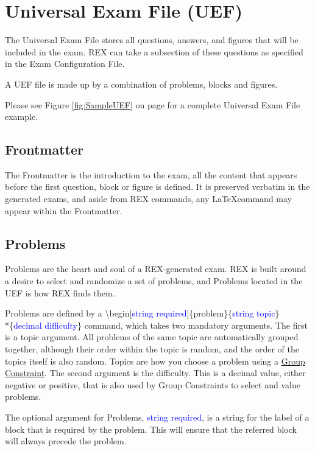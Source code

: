 \documentclass{article}
\begin{document}
\section{Universal Exam File (UEF)}
The Universal Exam File stores all questions, answers, and figures that will be
included in the exam. REX can take a subsection of these questions as specified
in the Exam Configuration File. 

A UEF file is made up by a combination of problems, blocks and figures.

Please see Figure \ref{fig:SampleUEF} on page \pageref{fig:SampleUEF} for 
a complete Universal Exam File example.

\subsection{Frontmatter}
The Frontmatter is the introduction to the exam, all the content that appears before the first question, block or figure is defined. It is preserved verbatim in the generated exams, and aside from REX commands, any \LaTeX command may appear within the Frontmatter.

\subsection{Problems}
Problems are the heart and soul of a REX-generated exam. REX is built around a desire to select and randomize a set of problems, and Problems located in the UEF is how REX finds them.

Problems are defined by a \textbackslash{begin}[\textcolor{blue}{string required}]\{problem\}\{\textcolor{blue}{string topic}\}\\*\{\textcolor{blue}{decimal difficulty}\} command, which takes two mandatory arguments. The first is a topic argument. All problems of the same topic are automatically grouped together, although their order within the topic is random, and the order of the topics itself is also random. Topics are how you choose a problem using a \hyperref[GroupConstraints]{Group Constraint}. The second argument is the difficulty. This is a decimal value, either negative or positive, that is also used by Group Constraints to select and value problems.

The optional argument for Problems, \textcolor{blue}{string required}, is a string for the label of a block that is required by the problem. This will ensure that the referred block will always precede the problem.
\end{document}
